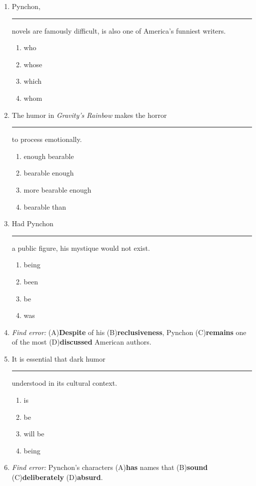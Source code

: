 \documentclass[10pt,a4paper]{article}
\begin{document}
\begin{enumerate}[label=\textbf{\arabic*.}, start=11, leftmargin=*]

\item Pynchon, \rule{2cm}{0.4pt} novels are famously difficult,
is also one of America's funniest writers.
\begin{enumerate}[label=(\Alph*)]
\item who \item whose \item which \item whom
\end{enumerate}

\item The humor in \emph{Gravity's Rainbow} makes the horror
\rule{2cm}{0.4pt} to process emotionally.
\begin{enumerate}[label=(\Alph*)]
\item enough bearable \item bearable enough
\item more bearable enough \item bearable than
\end{enumerate}

\item Had Pynchon \rule{2cm}{0.4pt} a public figure, his mystique
would not exist.
\begin{enumerate}[label=(\Alph*)]
\item being \item been \item be \item was
\end{enumerate}

\item \textit{Find error:}
(A)\textbf{Despite} of his (B)\textbf{reclusiveness}, Pynchon
(C)\textbf{remains} one of the most (D)\textbf{discussed} American
authors.

\item It is essential that dark humor \rule{2cm}{0.4pt} understood
in its cultural context.
\begin{enumerate}[label=(\Alph*)]
\item is \item be \item will be \item being
\end{enumerate}

\item \textit{Find error:}
Pynchon's characters (A)\textbf{has} names that (B)\textbf{sound}
(C)\textbf{deliberately} (D)\textbf{absurd}.


\end{enumerate}
\end{document}
